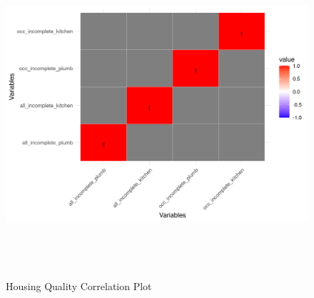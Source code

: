  \begin{figure}[htbp]
    \centering
     \includegraphics[width=1\textwidth, height=12cm]{plots/correlations/qual_prob_corr.png}
     \caption{Housing Quality Correlation Plot}
 \end{figure}



 \endinput